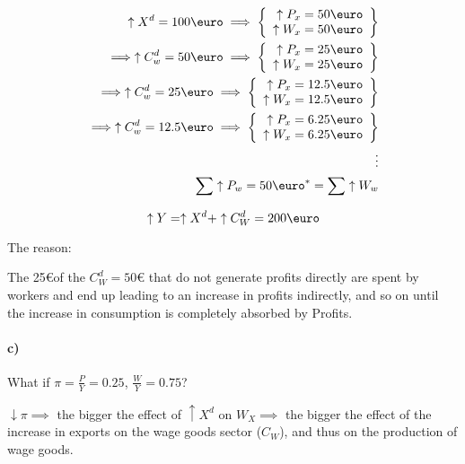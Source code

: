 \documentclass{report}
\begin{document}
\begin{align*}
\uparrow X^d = 100 \text{\euro} \implies \left\{ \begin{array}{r}
    \uparrow P_x = 50 \text{\euro} \\ \uparrow W_x = 50 \text{\euro}
\end{array} \right\} 
\\
 \implies  \uparrow C^d_w = 50 \text{\euro} \implies \left\{ \begin{array}{r}
    \uparrow P_x = 25 \text{\euro} \\ \uparrow W_x = 25 \text{\euro}
\end{array} \right\} 
\\
\implies \uparrow C^d_w = 25 \text{\euro} \implies \left\{ \begin{array}{r}
    \uparrow P_x = 12.5 \text{\euro} \\ \uparrow W_x = 12.5 \text{\euro}
\end{array} \right\}
\\
\implies \uparrow C^d_w = 12.5 \text{\euro} \implies \left\{ \begin{array}{r}
    \uparrow P_x = 6.25 \text{\euro} \\ \uparrow W_x = 6.25 \text{\euro}
\end{array} \right\} \\
\vdots 
\\
\sum \uparrow P_w = 50 \text{\euro}^* = \sum \uparrow W_w
\end{align*}

\begin{equation*}
    \uparrow Y=\uparrow X^d+\uparrow C^d_W = 200 \text{\euro}
\end{equation*}

The reason: 

The 25\euro of the $C^d_W=50\euro$ that do not generate profits directly are spent by workers and end up leading to an increase in profits indirectly, and so on until the increase in consumption is completely absorbed by Profits. 

\paragraph{c)} What if $\pi=\frac{P}{Y}=0.25$, $\frac{W}{Y}=0.75$? 

$\downarrow \pi \implies$ the bigger the effect of $\uparrow X^d$ on $W_X \implies$ the bigger the effect of the increase in exports on the wage goods sector ($C_W$), and thus on the production of wage goods. 
\end{document}
